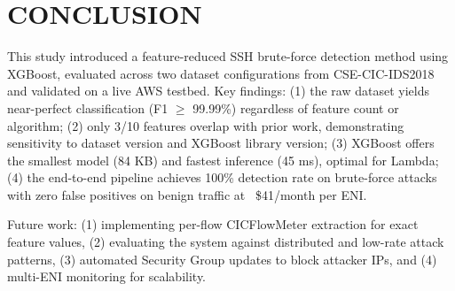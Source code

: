 \documentclass[conference]{IEEEtran}
\begin{document}
\section{CONCLUSION}

This study introduced a feature-reduced SSH brute-force detection method using XGBoost, evaluated across two dataset configurations from CSE-CIC-IDS2018 and validated on a live AWS testbed. Key findings: (1) the raw dataset yields near-perfect classification (F1 $\geq$ 99.99\%) regardless of feature count or algorithm; (2) only 3/10 features overlap with prior work, demonstrating sensitivity to dataset version and XGBoost library version; (3) XGBoost offers the smallest model (84 KB) and fastest inference (45 ms), optimal for Lambda; (4) the end-to-end pipeline achieves 100\% detection rate on brute-force attacks with zero false positives on benign traffic at ~\$41/month per ENI.

Future work: (1) implementing per-flow CICFlowMeter extraction for exact feature values, (2) evaluating the system against distributed and low-rate attack patterns, (3) automated Security Group updates to block attacker IPs, and (4) multi-ENI monitoring for scalability.
\end{document}
